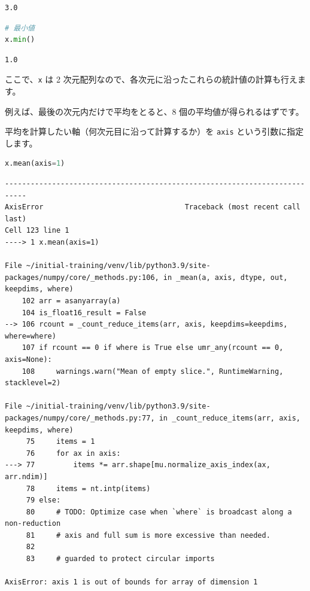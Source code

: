 \begin{lstlisting}[style=outputcell]
3.0
\end{lstlisting}

\begin{lstlisting}[style=codecell,language=Python]
# 最小値
x.min()
\end{lstlisting}

\begin{lstlisting}[style=outputcell]
1.0
\end{lstlisting}

ここで、\texttt{x} は 2 次元配列なので、各次元に沿ったこれらの統計値の計算も行えます。

例えば、最後の次元内だけで平均をとると、8 個の平均値が得られるはずです。

平均を計算したい軸（何次元目に沿って計算するか）を \texttt{axis} という引数に指定します。


\begin{lstlisting}[style=codecell,language=Python]
x.mean(axis=1)
\end{lstlisting}

\begin{lstlisting}[style=outputcell]
---------------------------------------------------------------------------
AxisError                                 Traceback (most recent call last)
Cell 123 line 1
----> 1 x.mean(axis=1)

File ~/initial-training/venv/lib/python3.9/site-packages/numpy/core/_methods.py:106, in _mean(a, axis, dtype, out, keepdims, where)
    102 arr = asanyarray(a)
    104 is_float16_result = False
--> 106 rcount = _count_reduce_items(arr, axis, keepdims=keepdims, where=where)
    107 if rcount == 0 if where is True else umr_any(rcount == 0, axis=None):
    108     warnings.warn("Mean of empty slice.", RuntimeWarning, stacklevel=2)

File ~/initial-training/venv/lib/python3.9/site-packages/numpy/core/_methods.py:77, in _count_reduce_items(arr, axis, keepdims, where)
     75     items = 1
     76     for ax in axis:
---> 77         items *= arr.shape[mu.normalize_axis_index(ax, arr.ndim)]
     78     items = nt.intp(items)
     79 else:
     80     # TODO: Optimize case when `where` is broadcast along a non-reduction
     81     # axis and full sum is more excessive than needed.
     82 
     83     # guarded to protect circular imports

AxisError: axis 1 is out of bounds for array of dimension 1
\end{lstlisting}

